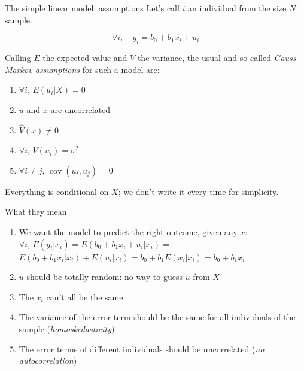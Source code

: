 \documentclass[aspectratio=169]{beamer}
\begin{document}
\begin{frame}{The simple linear model: assumptions}
Let's call $i$ an individual from the size $N$ sample.

\[\forall i, \quad y_i = b_0 + b_1x_i + u_i\]

Calling $E$ the expected value and $V$ the variance, the usual and so-called \textit{Gauss-Markov assumptions} for such a model are:

\begin{enumerate}
    \item $\forall i$, $E(u_i|X) = 0$
    \item $u$ and $x$ are uncorrelated
    \item $\hat{V}(x) \neq 0$
    \item $\forall i$, $V(u_i) = \sigma^2$
    \item $\forall i \neq j$, $\operatorname{cov}(u_i, u_j) = 0$
\end{enumerate}

Everything is conditional on $X$; we don't write it every time for simplicity.
\end{frame}

\begin{frame}{What they mean}
\begin{enumerate}
    \item We want the model to predict the right outcome, given any $x$:\\
    $\forall i$, $E(y_i|x_i) = E(b_0 + b_1x_i + u_i|x_i) =$\\
    $E(b_0 + b_1x_i|x_i) + E(u_i|x_i) = b_0 + b_1E(x_i|x_i) = b_0 + b_1x_i$
    \item $u$ should be totally random: no way to guess $u$ from $X$
    \item The $x_i$ can't all be the same
    \item The variance of the error term should be the same for all individuals of the sample (\textit{homoskedasticity})
    \item The error terms of different individuals should be uncorrelated (\textit{no autocorrelation})
\end{enumerate}
\end{frame}
\end{document}
